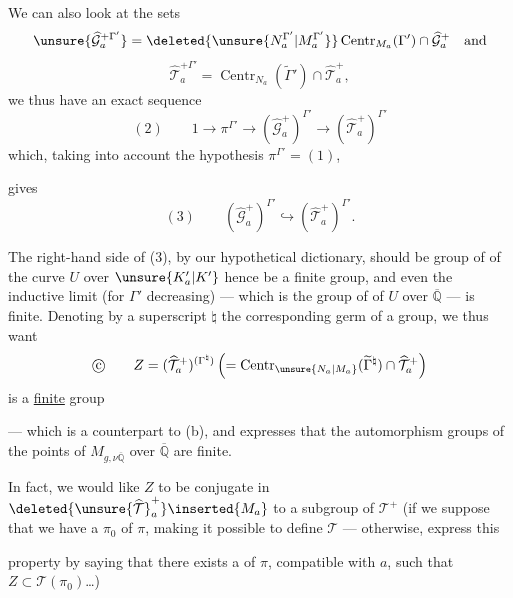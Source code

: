 We can also look at the sets
\[
\unsure{\widehat{\mathcal G}_a^{+\Gamma'}}
=
\deleted{\unsure{N_a^{\Gamma'}|M_a^{\Gamma'}}}
\operatorname{Centr}_{M_a}(\Gamma')\cap\widehat{\mathcal G}_a^+
\quad\text{and}
\]
\[
\widehat{\mathcal T}_a^{+\Gamma'}
=\operatorname{Centr}_{N_a}(\widetilde{\Gamma}')\cap\widehat{\mathcal T}_a^+,
\]
 we thus have an exact sequence
\[
(2)\qquad 1\longrightarrow\pi^{\Gamma'}\longrightarrow
(\widehat{\mathcal G}_a^+)^{\Gamma'}\longrightarrow
(\widehat{\mathcal T}_a^+)^{\Gamma'}
\]
which, taking into account the hypothesis $\pi^{\Gamma'}=(1)$,


gives
\[
(3)\qquad (\widehat{\mathcal G}_a^+)^{\Gamma'}
\hookrightarrow (\widehat{\mathcal T}_a^+)^{\Gamma'}.
\]

The right-hand side of (3), by our hypothetical dictionary, should be   group of  of the curve $U$ over $\unsure{K'_a|K'}$ hence be a finite group, and even  the inductive limit (for $\Gamma'$ decreasing) --- which is the group of  of $U$ over $\overline{\mathbb Q}$ --- is finite. Denoting by a superscript $\natural$ the corresponding germ of a group, we thus want
\[
\text{\textcircled{c}}\qquad
Z=(\widehat{\mathcal T}_a^+)^{(\Gamma^{\natural})}
\left(=\operatorname{Centr}_{\unsure{N_a|M_a}}
(\widetilde{\Gamma}^{\natural})\cap\widehat{\mathcal T}_a^+\right)
\]
is a \uline{finite} group

--- which is a counterpart to (b), and expresses that the automorphism groups of the points of $M_{g,\nu\overline{\mathbb Q}}$ over $\overline{\mathbb Q}$ are finite.

In fact, we would like $Z$ to be conjugate in $\deleted{\unsure{\widehat{\mathcal T}}_a^+}\inserted{M_a}$ to a subgroup of  $\mathcal T^+$  (if we suppose that we have a   $\pi_0$ of $\pi$, making it possible to define $\mathcal T$ --- otherwise,  express this


property by saying that there exists a   of $\pi$, compatible with $a$, such that $Z\subset\mathcal T(\pi_0)$\ldots)

